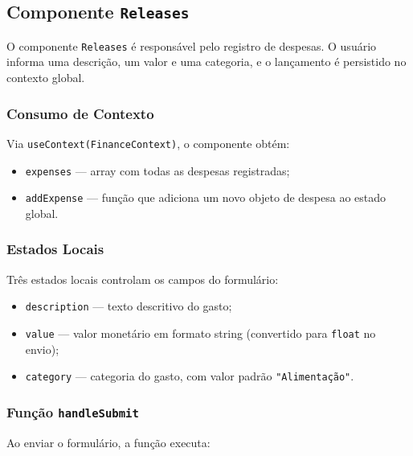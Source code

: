 \documentclass{article}
\begin{document}
\subsection{Componente \texttt{Releases}}

O componente \texttt{Releases} é responsável pelo registro de despesas. O usuário informa uma descrição, um valor e uma categoria, e o lançamento é persistido no contexto global.

\subsubsection*{Consumo de Contexto}

Via \texttt{useContext(FinanceContext)}, o componente obtém:

\begin{itemize}
  \item \texttt{expenses} — array com todas as despesas registradas;
  \item \texttt{addExpense} — função que adiciona um novo objeto de despesa ao estado global.
\end{itemize}

\subsubsection*{Estados Locais}

Três estados locais controlam os campos do formulário:

\begin{itemize}
  \item \texttt{description} — texto descritivo do gasto;
  \item \texttt{value} — valor monetário em formato string (convertido para \texttt{float} no envio);
  \item \texttt{category} — categoria do gasto, com valor padrão \texttt{"Alimentação"}.
\end{itemize}

\subsubsection*{Função \texttt{handleSubmit}}

Ao enviar o formulário, a função executa:
\end{document}
